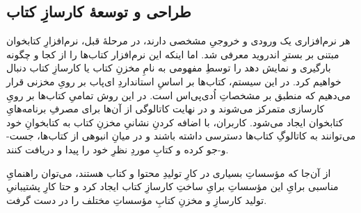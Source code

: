 \documentclass[]{article}
\begin{document}
\subsection{طراحی و توسعهٔ کارسازِ کتاب}
هر نرم‌افزاری یک ورودی و خروجیِ مشخصی دارند، در مرحلهٔ قبل، نرم‌افزارِ کتابخوان مبتنی بر بسترِ اندروید معرفی شد. اما اینکه این نرم‌افزار کتاب‌ها را از کجا و چگونه بارگیری و نمایش دهد را توسطِ مفهومی به نامِ مخزنِ کتاب یا کارسازِ کتاب دنبال خواهیم کرد. در این سیستم، کتاب‌ها بر اساسِ استانداردِ ای‌پاب بر رویِ مخزنی قرار می‌دهیم که منطبق بر مشخصاتِ اُدی‌پی‌اس است. در این روش تمامیِ کتاب‌ها بر رویِ کارسازی متمرکز می‌شوند و در نهایت کاتالوگی از آن‌ها برای مصرفِ برنامه‌هایِ کتابخوان ایجاد می‌شود. کاربران، با اضافه کردنِ نشانیِ مخزنِ کتاب به کتابخوانِ خود می‌توانند به کاتالوگِ کتاب‌ها دسترسی داشته باشند و در میانِ انبوهی از کتاب‌ها، جست-و-جو کرده و کتابِ موردِ نظرِ خود را پیدا و دریافت کنند.

از آن‌جا که مؤسساتِ بسیاری در کارِ تولیدِ محتوا و کتاب هستند، می‌توان راهنمایِ مناسبی برایِ این مؤسساتِ برایِ ساختِ کارسازِ کتاب ایجاد کرد و حتا کارِ پشتیبانیِ تولید کارسازِ و مخزنِ کتابِ مؤسساتِ مختلف را در دست گرفت.
\end{document}
